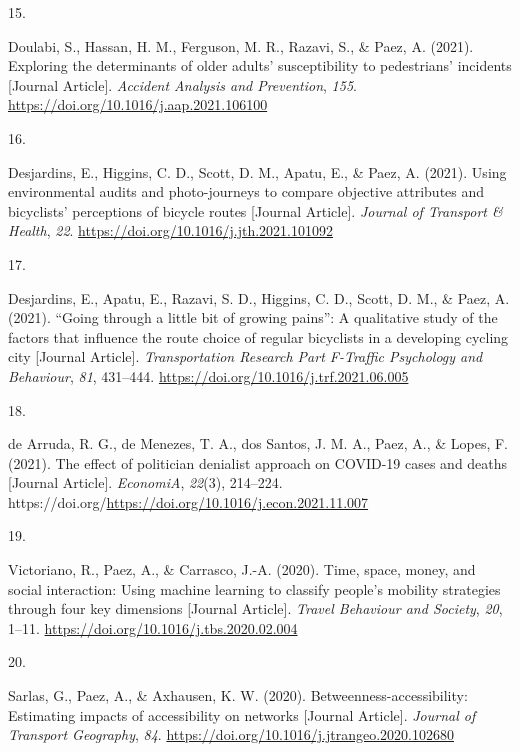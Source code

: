 \documentclass[10pt,a4paper,]{twentysecondcv}
\newlength{\csllabelwidth}
\newcommand{\CSLLeftMargin}[1]{\parbox[t]{\csllabelwidth}{#1}}
\newcommand{\CSLRightInline}[1]{\parbox[t]{\linewidth - \csllabelwidth}{#1}}
\begin{document}
\leavevmode{}%
\CSLLeftMargin{15. }%
\CSLRightInline{Doulabi, S., Hassan, H. M., Ferguson, M. R., Razavi, S.,
\& Paez, A. (2021). Exploring the determinants of older adults'
susceptibility to pedestrians' incidents {[}Journal Article{]}.
\emph{Accident Analysis and Prevention}, \emph{155}.
\url{https://doi.org/10.1016/j.aap.2021.106100}}

\leavevmode{}%
\CSLLeftMargin{16. }%
\CSLRightInline{Desjardins, E., Higgins, C. D., Scott, D. M., Apatu, E.,
\& Paez, A. (2021). Using environmental audits and photo-journeys to
compare objective attributes and bicyclists' perceptions of bicycle
routes {[}Journal Article{]}. \emph{Journal of Transport \& Health},
\emph{22}. \url{https://doi.org/10.1016/j.jth.2021.101092}}

\leavevmode{}%
\CSLLeftMargin{17. }%
\CSLRightInline{Desjardins, E., Apatu, E., Razavi, S. D., Higgins, C.
D., Scott, D. M., \& Paez, A. (2021). {``Going through a little bit of
growing pains''}: A qualitative study of the factors that influence the
route choice of regular bicyclists in a developing cycling city
{[}Journal Article{]}. \emph{Transportation Research Part F-Traffic
Psychology and Behaviour}, \emph{81}, 431--444.
\url{https://doi.org/10.1016/j.trf.2021.06.005}}

\leavevmode{}%
\CSLLeftMargin{18. }%
\CSLRightInline{de Arruda, R. G., de Menezes, T. A., dos Santos, J. M.
A., Paez, A., \& Lopes, F. (2021). The effect of politician denialist
approach on COVID-19 cases and deaths {[}Journal Article{]}.
\emph{EconomiA}, \emph{22}(3), 214--224.
https://doi.org/\url{https://doi.org/10.1016/j.econ.2021.11.007}}

\leavevmode{}%
\CSLLeftMargin{19. }%
\CSLRightInline{Victoriano, R., Paez, A., \& Carrasco, J.-A. (2020).
Time, space, money, and social interaction: Using machine learning to
classify people's mobility strategies through four key dimensions
{[}Journal Article{]}. \emph{Travel Behaviour and Society}, \emph{20},
1--11. \url{https://doi.org/10.1016/j.tbs.2020.02.004}}

\leavevmode{}%
\CSLLeftMargin{20. }%
\CSLRightInline{Sarlas, G., Paez, A., \& Axhausen, K. W. (2020).
Betweenness-accessibility: Estimating impacts of accessibility on
networks {[}Journal Article{]}. \emph{Journal of Transport Geography},
\emph{84}. \url{https://doi.org/10.1016/j.jtrangeo.2020.102680}}
\end{document}
